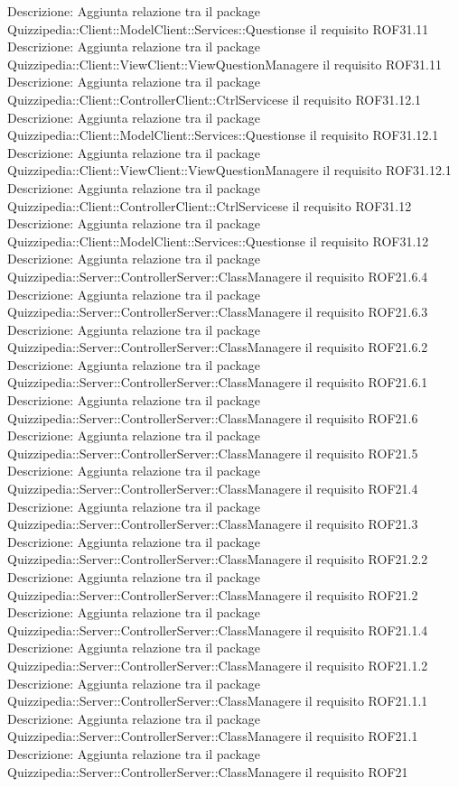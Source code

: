 Descrizione: Aggiunta relazione tra il package Quizzipedia::Client::ModelClient::Services::Questionse il requisito ROF31.11 
Descrizione: Aggiunta relazione tra il package Quizzipedia::Client::ViewClient::ViewQuestionManagere il requisito ROF31.11 
Descrizione: Aggiunta relazione tra il package Quizzipedia::Client::ControllerClient::CtrlServicese il requisito ROF31.12.1 
Descrizione: Aggiunta relazione tra il package Quizzipedia::Client::ModelClient::Services::Questionse il requisito ROF31.12.1 
Descrizione: Aggiunta relazione tra il package Quizzipedia::Client::ViewClient::ViewQuestionManagere il requisito ROF31.12.1 
Descrizione: Aggiunta relazione tra il package Quizzipedia::Client::ControllerClient::CtrlServicese il requisito ROF31.12 
Descrizione: Aggiunta relazione tra il package Quizzipedia::Client::ModelClient::Services::Questionse il requisito ROF31.12 
Descrizione: Aggiunta relazione tra il package Quizzipedia::Server::ControllerServer::ClassManagere il requisito ROF21.6.4 
Descrizione: Aggiunta relazione tra il package Quizzipedia::Server::ControllerServer::ClassManagere il requisito ROF21.6.3 
Descrizione: Aggiunta relazione tra il package Quizzipedia::Server::ControllerServer::ClassManagere il requisito ROF21.6.2 
Descrizione: Aggiunta relazione tra il package Quizzipedia::Server::ControllerServer::ClassManagere il requisito ROF21.6.1 
Descrizione: Aggiunta relazione tra il package Quizzipedia::Server::ControllerServer::ClassManagere il requisito ROF21.6 
Descrizione: Aggiunta relazione tra il package Quizzipedia::Server::ControllerServer::ClassManagere il requisito ROF21.5 
Descrizione: Aggiunta relazione tra il package Quizzipedia::Server::ControllerServer::ClassManagere il requisito ROF21.4 
Descrizione: Aggiunta relazione tra il package Quizzipedia::Server::ControllerServer::ClassManagere il requisito ROF21.3 
Descrizione: Aggiunta relazione tra il package Quizzipedia::Server::ControllerServer::ClassManagere il requisito ROF21.2.2 
Descrizione: Aggiunta relazione tra il package Quizzipedia::Server::ControllerServer::ClassManagere il requisito ROF21.2 
Descrizione: Aggiunta relazione tra il package Quizzipedia::Server::ControllerServer::ClassManagere il requisito ROF21.1.4 
Descrizione: Aggiunta relazione tra il package Quizzipedia::Server::ControllerServer::ClassManagere il requisito ROF21.1.2 
Descrizione: Aggiunta relazione tra il package Quizzipedia::Server::ControllerServer::ClassManagere il requisito ROF21.1.1 
Descrizione: Aggiunta relazione tra il package Quizzipedia::Server::ControllerServer::ClassManagere il requisito ROF21.1 
Descrizione: Aggiunta relazione tra il package Quizzipedia::Server::ControllerServer::ClassManagere il requisito ROF21 
